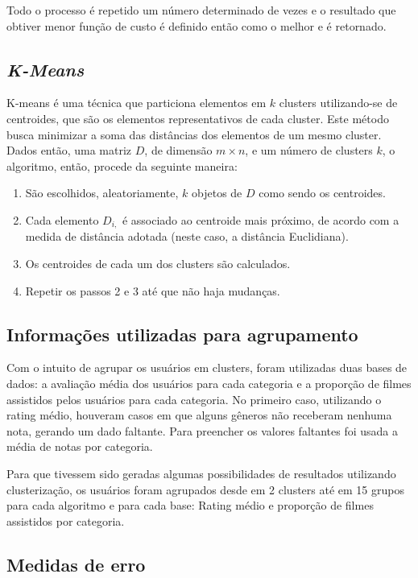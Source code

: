 \documentclass[12pt,a4paper,header]{abnt}
\begin{document}
Todo o processo é repetido um número determinado de vezes e o resultado que obtiver menor função de custo é definido então como o melhor e é retornado\cite{bhat2014k}.

\subsection{\textit{K-Means}}
K-means é uma técnica que particiona elementos em $k$ clusters utilizando-se de centroides, que são os elementos representativos de cada cluster. Este método busca minimizar a soma das distâncias dos elementos de um mesmo cluster. Dados então, uma matriz $D$, de dimensão $m \times n$, e um número de clusters $k$, o algoritmo, então, procede da seguinte maneira\cite{han2011data}:

\begin{enumerate}

\item{São escolhidos, aleatoriamente, $k$ objetos de $D$ como sendo os centroides.}
\item{Cada elemento $D_{i,}$ é associado ao centroide mais próximo, de acordo com a medida de distância adotada (neste caso, a distância Euclidiana).}
\item{Os centroides de cada um dos clusters são calculados.}
\item{Repetir os passos 2 e 3 até que não haja mudanças.}

\end{enumerate}

\subsection{Informações utilizadas para agrupamento}

Com o intuito de agrupar os usuários em clusters, foram utilizadas duas bases de dados: a avaliação média dos usuários para cada categoria e a proporção de filmes assistidos pelos usuários para cada categoria. No primeiro caso, utilizando o rating médio, houveram casos em que alguns gêneros não receberam nenhuma nota, gerando um dado faltante. Para preencher os valores faltantes foi usada a média de notas por categoria.

Para que tivessem sido geradas algumas possibilidades de resultados utilizando clusterização, os usuários foram agrupados desde em 2 clusters até em 15 grupos para cada algoritmo e para cada base: Rating médio e proporção de filmes assistidos por categoria.

\subsection{Medidas de erro}
\end{document}
